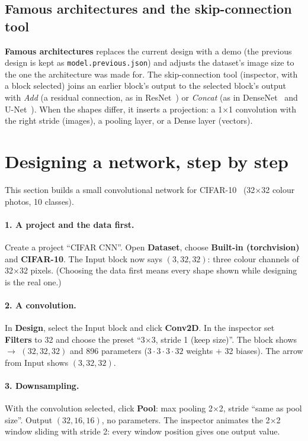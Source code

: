 \documentclass[11pt,a4paper]{article}
\newcommand{\ui}[1]{\textbf{\textsf{#1}}}
\newcommand{\file}[1]{\texttt{#1}}
\newcommand{\shape}[1]{$(#1)$}
\begin{document}
\subsection{Famous architectures and the skip-connection tool}
\ui{Famous architectures} replaces the current design with a demo (the previous design is kept as \file{model.previous.json}) and adjusts
the dataset's image size to the one the architecture was made for. The skip-connection tool (inspector, with a block selected) joins an
earlier block's output to the selected block's output with \emph{Add} (a residual connection, as in ResNet~\cite{he2015resnet}) or
\emph{Concat} (as in DenseNet~\cite{huang2016densenet} and U-Net~\cite{ronneberger2015unet}). When the shapes differ, it inserts a
projection: a 1$\times$1 convolution with the right stride (images), a pooling layer, or a Dense layer (vectors).

\section{Designing a network, step by step}

This section builds a small convolutional network for CIFAR-10~\cite{krizhevsky2009cifar} (32$\times$32 colour photos, 10 classes).

\paragraph{1. A project and the data first.}
Create a project ``CIFAR CNN''. Open \ui{Dataset}, choose \ui{Built-in (torchvision)} and \ui{CIFAR-10}. The Input block now says
\shape{3, 32, 32}: three colour channels of 32$\times$32 pixels. (Choosing the data first means every shape shown while designing is the
real one.)

\paragraph{2. A convolution.}
In \ui{Design}, select the Input block and click \ui{Conv2D}. In the inspector set \ui{Filters} to 32 and choose the preset
``3$\times$3, stride 1 (keep size)''. The block shows $\rightarrow$ \shape{32, 32, 32} and 896 parameters
($3\cdot3\cdot3\cdot32$ weights $+$ 32 biases). The arrow from Input shows \shape{3, 32, 32}.

\paragraph{3. Downsampling.}
With the convolution selected, click \ui{Pool}: max pooling 2$\times$2, stride ``same as pool size''. Output \shape{32, 16, 16}, no
parameters. The inspector animates the 2$\times$2 window sliding with stride 2: every window position gives one output value.
\end{document}
